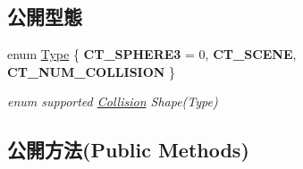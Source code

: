 \subsection*{公開型態}
\begin{DoxyCompactItemize}
\item 
enum \hyperlink{class_magnum_1_1_collision_af96418629e7663358a39f8138bc412a7}{Type} \{ {\bfseries C\+T\+\_\+\+S\+P\+H\+E\+R\+E3} = 0, 
{\bfseries C\+T\+\_\+\+S\+C\+E\+NE}, 
{\bfseries C\+T\+\_\+\+N\+U\+M\+\_\+\+C\+O\+L\+L\+I\+S\+I\+ON}
 \}\begin{DoxyCompactList}\small\item\em enum supported \hyperlink{class_magnum_1_1_collision}{Collision} Shape(\+Type) \end{DoxyCompactList}
\end{DoxyCompactItemize}
\subsection*{公開方法(Public Methods)}
